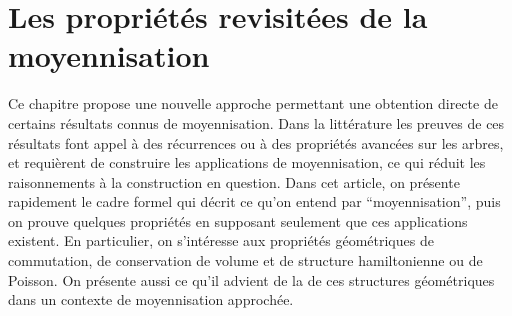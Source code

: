
\clearemptydoublepage
\chapter{Les propriétés revisitées de la moyennisation}
\label{chap:avg}

Ce chapitre propose une nouvelle approche permettant une obtention
directe de certains résultats connus de moyennisation. Dans la
littérature les preuves de ces résultats font appel à des récurrences ou
à des propriétés avancées sur les arbres, et requièrent de construire
les applications de moyennisation, ce qui réduit les raisonnements à la
construction en question. Dans cet article, on présente rapidement le
cadre formel qui décrit ce qu'on entend par \enquote{moyennisation},
puis on prouve quelques propriétés en supposant seulement que ces
applications existent. En particulier, on s'intéresse aux propriétés
géométriques de commutation, de conservation de volume et de structure
hamiltonienne ou de Poisson. On présente aussi ce qu'il advient de la de
ces structures géométriques dans un contexte de moyennisation approchée.













